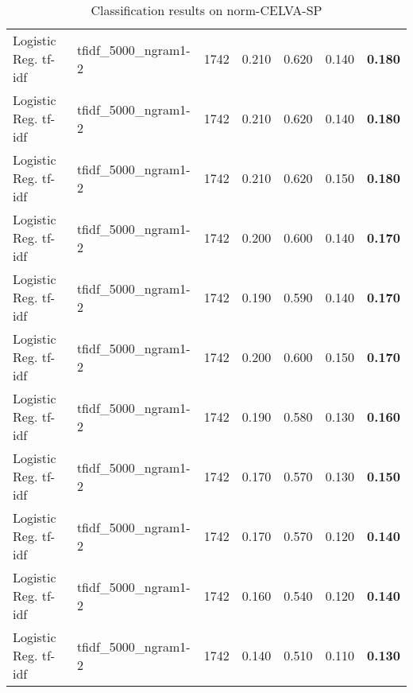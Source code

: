 \begin{table*}[t]
\begin{tabular}{l l r r r r r}
Logistic Reg. tf-idf & tfidf_5000_ngram1-2 & 1742 & 0.210 & 0.620 & 0.140 & \textbf{0.180} \\
Logistic Reg. tf-idf & tfidf_5000_ngram1-2 & 1742 & 0.210 & 0.620 & 0.140 & \textbf{0.180} \\
Logistic Reg. tf-idf & tfidf_5000_ngram1-2 & 1742 & 0.210 & 0.620 & 0.150 & \textbf{0.180} \\
Logistic Reg. tf-idf & tfidf_5000_ngram1-2 & 1742 & 0.200 & 0.600 & 0.140 & \textbf{0.170} \\
Logistic Reg. tf-idf & tfidf_5000_ngram1-2 & 1742 & 0.190 & 0.590 & 0.140 & \textbf{0.170} \\
Logistic Reg. tf-idf & tfidf_5000_ngram1-2 & 1742 & 0.200 & 0.600 & 0.150 & \textbf{0.170} \\
Logistic Reg. tf-idf & tfidf_5000_ngram1-2 & 1742 & 0.190 & 0.580 & 0.130 & \textbf{0.160} \\
Logistic Reg. tf-idf & tfidf_5000_ngram1-2 & 1742 & 0.170 & 0.570 & 0.130 & \textbf{0.150} \\
Logistic Reg. tf-idf & tfidf_5000_ngram1-2 & 1742 & 0.170 & 0.570 & 0.120 & \textbf{0.140} \\
Logistic Reg. tf-idf & tfidf_5000_ngram1-2 & 1742 & 0.160 & 0.540 & 0.120 & \textbf{0.140} \\
Logistic Reg. tf-idf & tfidf_5000_ngram1-2 & 1742 & 0.140 & 0.510 & 0.110 & \textbf{0.130} \\
\hline
\end{tabular}
\caption{Classification results on norm-CELVA-SP}
\label{tab:norm_celva_sp_results}
\end{table*}